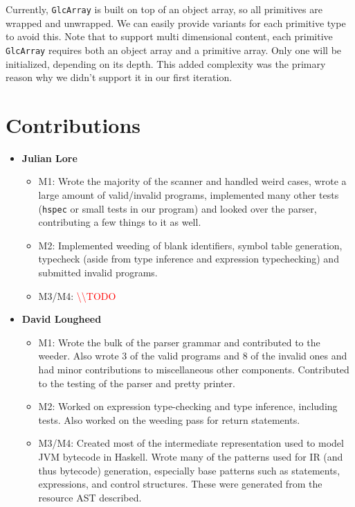\documentclass[11pt]{article}
\newcommand{\todo}[0]{\textcolor{red}{\textbackslash\textbackslash TODO \ }}
\begin{document}
Currently, \texttt{GlcArray} is built on top of an object array, 
so all primitives are wrapped and unwrapped.
We can easily provide variants for each primitive type to avoid this.
Note that to support multi dimensional content,
each primitive \texttt{GlcArray} requires both an object array and a primitive array. Only one will be initialized, depending on its depth.
This added complexity was the primary reason why we didn't support it in our first iteration.

\section{Contributions}
\begin{itemize}
	\item \textbf{Julian Lore}
	\begin{itemize}
		\item M1: Wrote the majority of the scanner and
		handled weird cases, wrote a large amount of valid/invalid programs,
		implemented many other tests (\texttt{hspec} or small tests in our
		program) and looked over the parser, contributing a few things to it
		as well.
		\item M2: Implemented weeding of blank identifiers,
		symbol table generation, typecheck (aside from type inference and
		expression typechecking) and submitted invalid programs.
		\item M3/M4: \todo%
	\end{itemize}
	\item \textbf{David Lougheed}
	\begin{itemize}
		\item M1: Wrote the bulk of the parser grammar
		and contributed to the weeder. Also wrote 3 of the valid programs
		and 8 of the invalid ones and had minor contributions to
		miscellaneous other components.  Contributed to the testing of the
		parser and pretty printer.
		\item M2: Worked on expression type-checking and
		type inference, including tests. Also worked on the weeding pass for
		return statements.
		\item M3/M4: Created most of the intermediate representation used to
		model JVM bytecode in Haskell. Wrote many of the patterns used for IR
		(and thus bytecode) generation, especially base patterns such as
		statements, expressions, and control structures. These were generated
		from the resource AST described.
	\end{itemize}

\end{itemize}
\end{document}
